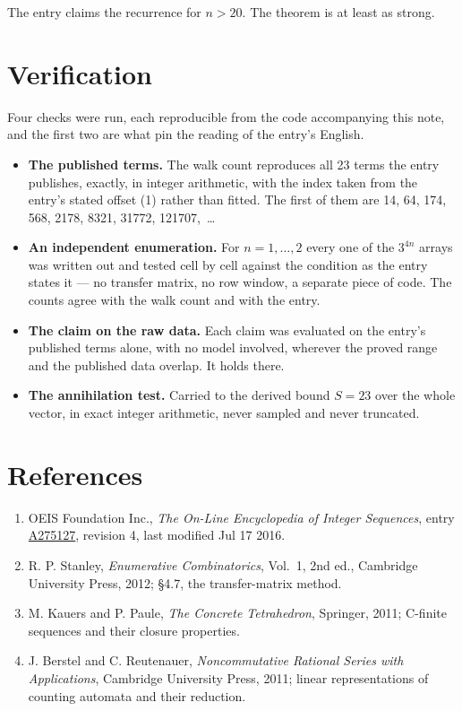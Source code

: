 \documentclass[11pt]{article}
\theoremstyle{definition}
\begin{document}
The entry claims the recurrence for $n > 20$. The theorem is at least as strong.

\section{Verification}

Four checks were run, each reproducible from the code accompanying this note, and the first two are what pin the reading of the entry's English.

\begin{itemize}

\item {\bfseries The published terms.} The walk count reproduces all 23 terms the entry publishes, exactly, in integer arithmetic, with the index taken from the entry's stated offset (1) rather than fitted. The first of them are 14, 64, 174, 568, 2178, 8321, 31772, 121707,~\dots

\item {\bfseries An independent enumeration.} For $n = 1,\dots,2$ every one of the $3^{4n}$ arrays was written out and tested cell by cell against the condition as the entry states it --- no transfer matrix, no row window, a separate piece of code. The counts agree with the walk count and with the entry.

\item {\bfseries The claim on the raw data.} Each claim was evaluated on the entry's published terms alone, with no model involved, wherever the proved range and the published data overlap. It holds there.

\item {\bfseries The annihilation test.} Carried to the derived bound $S = 23$ over the whole vector, in exact integer arithmetic, never sampled and never truncated.

\end{itemize}

\section{References}

\begin{enumerate}

\item OEIS Foundation Inc., \emph{The On-Line Encyclopedia of Integer Sequences}, entry \href{https://oeis.org/A275127}{A275127}, revision 4, last modified Jul 17 2016.

\item R. P. Stanley, \emph{Enumerative Combinatorics}, Vol.~1, 2nd ed., Cambridge University Press, 2012; \S4.7, the transfer-matrix method.

\item M. Kauers and P. Paule, \emph{The Concrete Tetrahedron}, Springer, 2011; C-finite sequences and their closure properties.

\item J. Berstel and C. Reutenauer, \emph{Noncommutative Rational Series with Applications}, Cambridge University Press, 2011; linear representations of counting automata and their reduction.

\end{enumerate}
\end{document}

